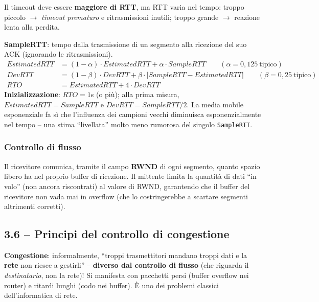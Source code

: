 \documentclass[12pt, a4paper]{article}
\begin{document}
Il timeout deve essere \textbf{maggiore di RTT}, ma RTT varia nel tempo: troppo piccolo $\to$ \textit{timeout prematuro} e ritrasmissioni inutili; troppo grande $\to$ reazione lenta alla perdita.

\begin{tcolorbox}[colback=lightergray!10, colframe=tocsec, title=\textbf{Formule di stima (RFC 6298)}]
\textbf{SampleRTT}: tempo dalla trasmissione di un segmento alla ricezione del suo ACK (ignorando le ritrasmissioni).
\begin{align*}
EstimatedRTT &= (1-\alpha)\cdot EstimatedRTT + \alpha\cdot SampleRTT \qquad (\alpha=0{,}125\ \text{tipico}) \\
DevRTT &= (1-\beta)\cdot DevRTT + \beta\cdot |SampleRTT - EstimatedRTT| \qquad (\beta=0{,}25\ \text{tipico}) \\
RTO &= EstimatedRTT + 4\cdot DevRTT
\end{align*}
\textbf{Inizializzazione}: $RTO=1$s (o più); alla prima misura, $EstimatedRTT=SampleRTT$ e $DevRTT=SampleRTT/2$. La media mobile esponenziale fa sì che l'influenza dei campioni vecchi diminuisca esponenzialmente nel tempo -- una stima ``livellata'' molto meno rumorosa del singolo \texttt{SampleRTT}.
\end{tcolorbox}

\subsubsection{Controllo di flusso}

Il ricevitore comunica, tramite il campo \textbf{RWND} di ogni segmento, quanto spazio libero ha nel proprio buffer di ricezione. Il mittente limita la quantità di dati ``in volo'' (non ancora riscontrati) al valore di RWND, garantendo che il buffer del ricevitore non vada mai in overflow (che lo costringerebbe a scartare segmenti altrimenti corretti).

\subsection{3.6 -- Principi del controllo di congestione}

\textbf{Congestione}: informalmente, ``troppi trasmettitori mandano troppi dati e la \textbf{rete} non riesce a gestirli'' -- \textcolor{red!70!black}{\textbf{diverso dal controllo di flusso}} (che riguarda il \textit{destinatario}, non la rete)! Si manifesta con pacchetti persi (buffer overflow nei router) e ritardi lunghi (codo nei buffer). È uno dei problemi classici dell'informatica di rete.
\end{document}
